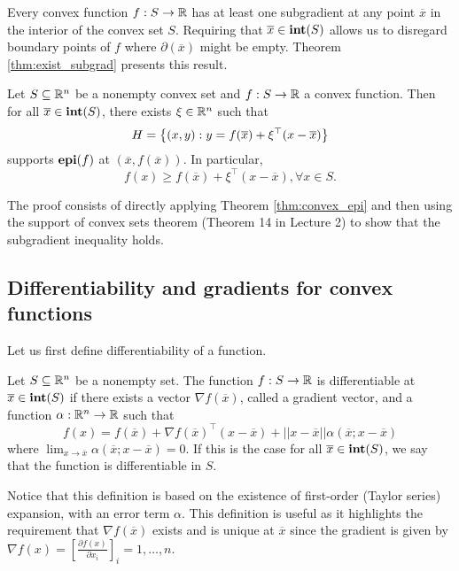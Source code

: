 Every convex function $f : S \to \mathbb{R}$ has at least one subgradient at any point $\overline{x}$ in the interior of the convex set $S$. Requiring that $\overline{x} \in \mathop{\bf int}(S)$ allows us to disregard boundary points of $f$ where $\partial(\overline{x})$ might be empty. Theorem \ref{thm:exist_subgrad} presents this result.
%
\begin{theorem}\label{thm:exist_subgrad}
	Let $S \subseteq \mathbb{R}^n$ be a nonempty convex set and $f:S \to \mathbb{R}$ a convex function. Then for all $\overline{x} \in \mathop{\bf int}(S)$, there exists $\xi\in \mathbb{R}^n$ such that
	$$ H = \left\{ (x,y) : y = f(\overline{x}) + \xi^\top(x - \overline{x}) \right \}$$ supports $\mathop{\bf epi}(f)$ at $(\overline{x}, f(\overline{x}))$. In particular,
	$$f(x) \geq f(\overline{x}) + \xi^\top(x - \overline{x}), \forall x \in S.$$
\end{theorem}
%
The proof consists of directly applying Theorem \ref {thm:convex_epi} and then using the support of convex sets theorem (Theorem 14 in Lecture 2) to show that the subgradient inequality holds.


\subsection{Differentiability and gradients for convex functions} 


Let us first define differentiability of a function.
%
\begin{definition}
	Let $S \subseteq \mathbb{R}^n$ be a nonempty set. The function $f:S \to \mathbb{R}$ is differentiable at $\overline{x} \in \mathop{\bf int}(S)$ if there exists a vector $\nabla f(\overline{x})$, called a gradient vector, and a function $\alpha: \mathbb{R}^n \to \mathbb{R}$ such that 
	$$
	f(x) = f(\overline{x}) + \nabla f(\overline{x})^\top(x - \overline{x}) + ||x-\overline{x}||\alpha(\overline{x};x-\overline{x})
	$$ 
	where $\lim_{x \to \overline{x}}\alpha(\overline{x}; x - \overline{x})=0$. If this is the case for all $\overline{x} \in \mathop{\bf int}(S)$, we say that the function is differentiable in $S$.
\end{definition}
%
Notice that this definition is based on the existence of first-order (Taylor series) expansion, with an error term $\alpha$. This definition is useful as it highlights the requirement that $\nabla f(\overline{x})$ exists and is unique at $\overline{x}$ since the gradient is given by $\nabla f(x) = \left[ \frac{\partial f(x)}{\partial x_i} \right]_i=1,\dots,n$. 

